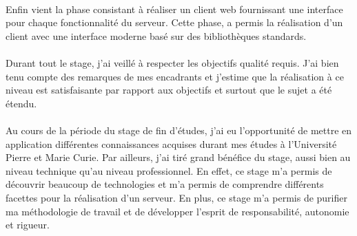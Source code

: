 \documentclass{report}
\begin{document}
\paragraph{}
Enfin vient la phase consistant à réaliser un client web fournissant une interface pour chaque fonctionnalité du serveur. Cette phase,
a permis la réalisation d'un client avec une interface moderne basé sur des bibliothèques standards.

\paragraph{}
Durant tout le stage, j'ai veillé à respecter les objectifs qualité requis. J'ai bien tenu compte des remarques de mes encadrants et 
j'estime que la réalisation à ce niveau est satisfaisante par rapport aux objectifs et surtout que le sujet a été étendu.

\paragraph{}
Au cours de la période du stage de fin d'études, j'ai eu l'opportunité de mettre en application différentes connaissances acquises 
durant mes études à l'Université Pierre et Marie Curie. Par ailleurs, j'ai tiré grand bénéfice du stage, aussi bien au niveau technique
qu'au niveau professionnel. En effet, ce stage m'a permis de découvrir beaucoup de technologies et m'a permis de comprendre
différents facettes pour la réalisation d'un serveur. En plus, ce stage m'a permis de purifier ma méthodologie de travail et de 
développer l'esprit de responsabilité, autonomie et rigueur.
\end{document}
